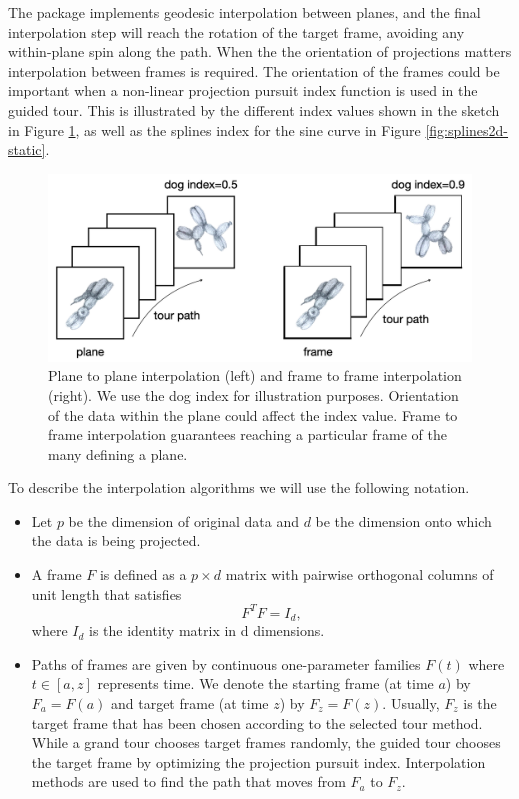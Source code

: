 \documentclass{article}
\begin{document}
The  package implements geodesic interpolation between
planes, and the final interpolation step will reach the rotation of the
target frame, avoiding any within-plane spin along the path. When the
the orientation of projections matters interpolation between frames is
required. The orientation of the frames could be important when a
non-linear projection pursuit index function is used in the guided tour.
This is illustrated by the different index values shown in the sketch in
Figure \ref{fig:dogs}, as well as the splines index for the sine curve
in Figure \ref{fig:splines2d-static}.

\begin{figure}

{\centering \includegraphics[width=1\linewidth]{figures/dog_index} 

}

\caption{Plane to plane interpolation (left) and frame to frame interpolation (right). We use the dog index for illustration purposes. Orientation of the data within the plane could affect the index value. Frame to frame interpolation guarantees reaching a particular frame of the many defining a plane.}\label{fig:dogs}
\end{figure}

To describe the interpolation algorithms we will use the following
notation.

\begin{itemize}
\item
  Let \(p\) be the dimension of original data and \(d\) be the dimension
  onto which the data is being projected.
\item
  A frame \(F\) is defined as a \(p\times d\) matrix with pairwise
  orthogonal columns of unit length that satisfies \[F^TF = I_d,\] where
  \(I_d\) is the identity matrix in d dimensions.
\item
  Paths of frames are given by continuous one-parameter families
  \(F(t)\) where \(t\in [a, z]\) represents time. We denote the starting
  frame (at time \(a\)) by \(F_a = F(a)\) and target frame (at time
  \(z\)) by \(F_z = F(z)\). Usually, \(F_z\) is the target frame that
  has been chosen according to the selected tour method. While a grand
  tour chooses target frames randomly, the guided tour chooses the
  target frame by optimizing the projection pursuit index. Interpolation
  methods are used to find the path that moves from \(F_a\) to \(F_z\).
\end{itemize}
\end{document}
